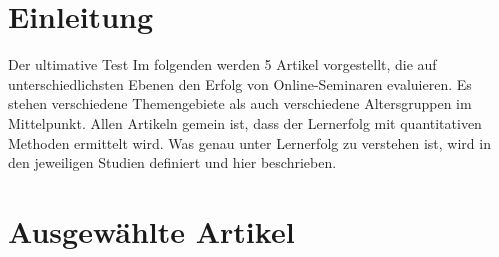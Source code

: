 \section{Einleitung}\label{einleitung}

Der ultimative Test Im folgenden werden 5 Artikel vorgestellt, die auf
unterschiedlichsten Ebenen den Erfolg von Online-Seminaren evaluieren.
Es stehen verschiedene Themengebiete als auch verschiedene Altersgruppen
im Mittelpunkt. Allen Artikeln gemein ist, dass der Lernerfolg mit
quantitativen Methoden ermittelt wird. Was genau unter Lernerfolg zu
verstehen ist, wird in den jeweiligen Studien definiert und hier
beschrieben.

\section{Ausgewählte Artikel}\label{ausgewuxe4hlte-artikel}

\textbf{}

